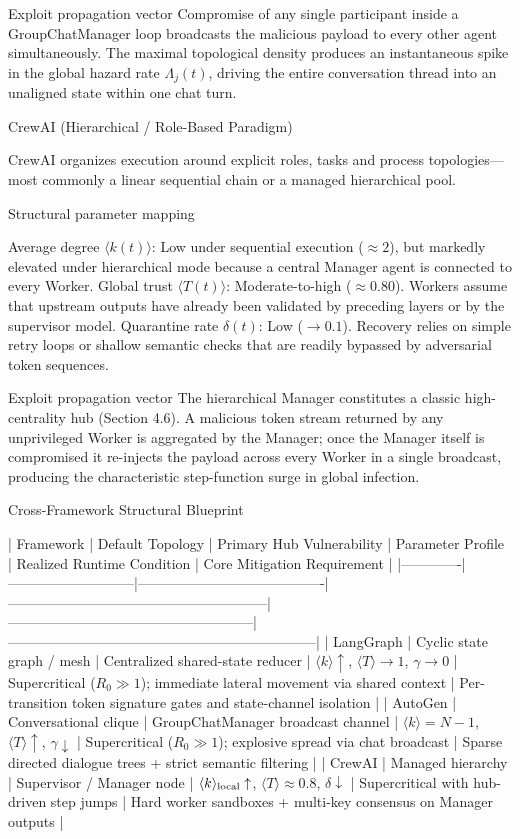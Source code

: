 Exploit propagation vector  
Compromise of any single participant inside a GroupChatManager loop broadcasts the malicious payload to every other agent simultaneously. The maximal topological density produces an instantaneous spike in the global hazard rate \(\Lambda_j(t)\), driving the entire conversation thread into an unaligned state within one chat turn.

CrewAI (Hierarchical / Role-Based Paradigm)

CrewAI organizes execution around explicit roles, tasks and process topologies—most commonly a linear sequential chain or a managed hierarchical pool.

Structural parameter mapping

Average degree \(\langle k(t)\rangle\): Low under sequential execution (\(\approx 2\)), but markedly elevated under hierarchical mode because a central Manager agent is connected to every Worker.
Global trust \(\langle T(t)\rangle\): Moderate-to-high (\(\approx 0.80\)). Workers assume that upstream outputs have already been validated by preceding layers or by the supervisor model.
Quarantine rate \(\delta(t)\): Low (\(\to 0.1\)). Recovery relies on simple retry loops or shallow semantic checks that are readily bypassed by adversarial token sequences.

Exploit propagation vector  
The hierarchical Manager constitutes a classic high-centrality hub (Section 4.6). A malicious token stream returned by any unprivileged Worker is aggregated by the Manager; once the Manager itself is compromised it re-injects the payload across every Worker in a single broadcast, producing the characteristic step-function surge in global infection.

Cross-Framework Structural Blueprint

| Framework   | Default Topology          | Primary Hub Vulnerability              | Parameter Profile                                      | Realized Runtime Condition                          | Core Mitigation Requirement                                      |
|-------------|---------------------------|----------------------------------------|--------------------------------------------------------|-----------------------------------------------------|------------------------------------------------------------------|
| LangGraph   | Cyclic state graph / mesh | Centralized shared-state reducer       | \(\langle k\rangle\uparrow\), \(\langle T\rangle\to 1\), \(\gamma\to 0\) | Supercritical (\(R_0\gg 1\)); immediate lateral movement via shared context | Per-transition token signature gates and state-channel isolation |
| AutoGen     | Conversational clique     | GroupChatManager broadcast channel     | \(\langle k\rangle=N-1\), \(\langle T\rangle\uparrow\), \(\gamma\downarrow\) | Supercritical (\(R_0\gg 1\)); explosive spread via chat broadcast | Sparse directed dialogue trees + strict semantic filtering       |
| CrewAI      | Managed hierarchy         | Supervisor / Manager node              | \(\langle k\rangle_{\rm local}\uparrow\), \(\langle T\rangle\approx 0.8\), \(\delta\downarrow\) | Supercritical with hub-driven step jumps             | Hard worker sandboxes + multi-key consensus on Manager outputs   |

